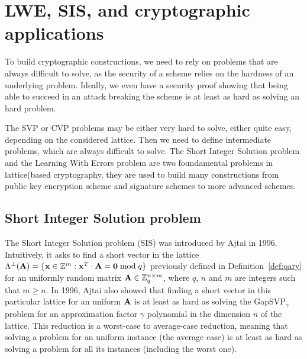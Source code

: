 \section{LWE, SIS, and cryptographic applications}
\label{se:LBC}



To build cryptographic constructions, we need to rely on problems that are always difficult to solve, as the security of a scheme relies on the hardness of an underlying problem. Ideally, we even have a security proof showing that being able to succeed in an attack breaking the scheme is at least as hard as solving an hard problem.

The SVP or CVP problems may be either very hard to solve, either quite easy, depending on the considered lattice. Then we need to define intermediate problems, which are always difficult to solve.
The Short Integer Solution problem and the Learning With Errors problem are two foundamental problems in lattice(based cryptography, they are used to build many constructions from public key encryption scheme and signature schemes to more advanced schemes.


\subsection{Short Integer Solution problem}

The Short Integer Solution problem (SIS) was introduced by Ajtai in 1996. Intuitively, it asks to find a short vector in the lattice $\Lambda^\perp({\bf A}) = \{ {\bf x} \in \mathbb{Z}^m: {\bf x}^T \cdot {\bf A} = {\bf 0} \bmod q\}$ previously defined in Definition~\ref{def:qary} for an uniformly random matrix ${\bf A} \in \mathbb{Z}_q^{n \times m}$, where $q$, $n$ and $m$ are integers such that $m \geq n$.
In 1996, Ajtai also showed that finding a short vector in this particular lattice for an uniform $\bf A$ is at least as hard as solving the GapSVP$_{\gamma}$ problem for an approximation factor $\gamma$ polynomial in the dimension $n$ of the lattice.
This reduction is a worst-case to average-case reduction, meaning that solving a problem for an uniform instance (the average case) is at least as hard as solving a problem for all its instances (including the worst one).


